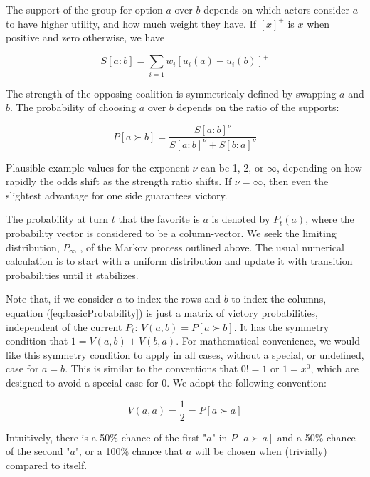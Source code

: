 \documentclass[a4paper,10pt]{article}
\begin{document}
The support of the group for option $a$  over $b$   depends on which actors consider $a$
  to have higher utility, and how much weight they have. If $\left[x\right]^{+}$
  is $x$
  when positive and zero otherwise, we have

\begin{equation} \label{eq:basicSupport}
S\left[a:b\right]=\sum_{i=1}w_{i}\left[u_{i}\left(a\right)-u_{i}\left(b\right)\right]^{+}
\end{equation} 
 

The strength of the opposing coalition is symmetricaly defined by swapping $a$  and $b$.
The probability of choosing $a$   over $b$   depends on the ratio of the supports:


\begin{equation} \label{eq:basicProbability}
P\left[a\succ b\right] = \frac{ S[a:b]^\nu }{S[a:b]^\nu +S[b:a]^\nu}
\end{equation}

Plausible example values for the exponent $\nu$ can be 1, 2, or $\infty$, depending on how rapidly the odds shift as the strength ratio shifts. If   $\nu =\infty$, then even the slightest advantage for one side guarantees victory.


The probability at turn $t$   that the favorite is $a$
  is denoted by $P_{t}(a)$, where the probability vector is considered to be a column-vector.
 We seek the limiting distribution, $P_{\infty}$ , of the Markov process outlined above.
The usual numerical calculation is to start with a uniform distribution and update it with transition probabilities until it stabilizes.


Note that, if we consider $a$ to index the rows and $b$ to index the columns, equation (\ref{eq:basicProbability}) is just
 a matrix of victory probabilities,
independent of the current $P_t$: $V(a,b) = P[a \succ b]$.  It has the symmetry
condition that $1 =V(a,b) +V(b,a)$. For mathematical convenience, we would like this symmetry condition
to apply in all cases, without a special, or  undefined, case for $a=b$. This is similar to 
the conventions that $0!=1$ or $1=x^0$, which are designed to avoid a special case for 0.
We adopt the following convention:


\begin{equation} \label{eq:trivialProbability}
V(a,a)= \frac{1}{2}  =  P[a \succ a]
\end{equation}

 Intuitively, there is a 50\% chance of the first "$a$" in $ P[a \succ a]$ and a 50\% chance of the 
second "$a$", or a 100\% chance
that $a$ will be chosen when (trivially) compared to itself.
\end{document}
